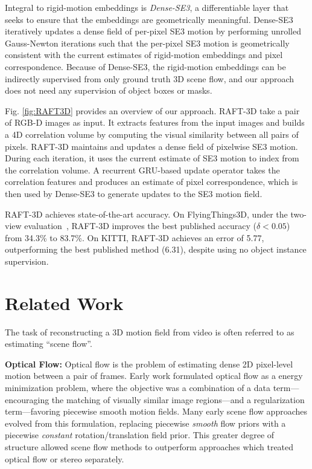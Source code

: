 \documentclass[final]{cvpr}
\begin{document}
Integral to rigid-motion embeddings is \emph{Dense-SE3}, a differentiable layer that seeks to ensure that the embeddings are geometrically meaningful. Dense-SE3 iteratively updates a dense field of per-pixel SE3 motion by performing unrolled Gauss-Newton iterations such that the per-pixel SE3 motion is geometrically consistent with the current estimates of rigid-motion embeddings and pixel correspondence. Because of Dense-SE3,  the rigid-motion embeddings can be indirectly supervised from only ground truth 3D scene flow, and our approach does not need any supervision of object boxes or masks. 

Fig. \ref{fig:RAFT3D} provides an overview of our approach. RAFT-3D take a pair of RGB-D images as input. It extracts features from the input images and builds a 4D correlation volume by computing the visual similarity between all pairs of pixels.  RAFT-3D maintains and updates a dense field of pixelwise SE3 motion. During each iteration, it uses the current estimate of SE3 motion to index from the correlation volume. A recurrent GRU-based update operator takes the correlation features and produces an estimate of pixel correspondence, which is then used by Dense-SE3 to generate updates to the SE3 motion field. 

RAFT-3D achieves state-of-the-art accuracy. 
On FlyingThings3D, under the two-view evaluation~\cite{liu2019flownet3d}, RAFT-3D improves the best published accuracy ($\delta < 0.05$) from 34.3\% to 83.7\%. On KITTI, RAFT-3D achieves an error of 5.77, outperforming the best published method (6.31), despite using no object instance supervision. 

\section{Related Work}

The task of reconstructing a 3D motion field from video is often referred to as estimating ``scene flow''. 

\vspace{1mm} \noindent \textbf{Optical Flow:} Optical flow is the problem of estimating dense 2D pixel-level motion between a pair of frames. Early work formulated optical flow as a energy minimization problem, where the objective was a combination of a data term---encouraging the matching of visually similar image regions---and a regularization term---favoring piecewise smooth motion fields. Many early scene flow approaches evolved from this formulation, replacing piecewise \emph{smooth} flow priors with a piecewise \emph{constant} rotation/translation field prior\cite{vogel2013piecewise,menze2015object}. This greater degree of structure allowed scene flow methods to outperform approaches which treated optical flow or stereo separately\cite{vogel20113d}.
\end{document}
